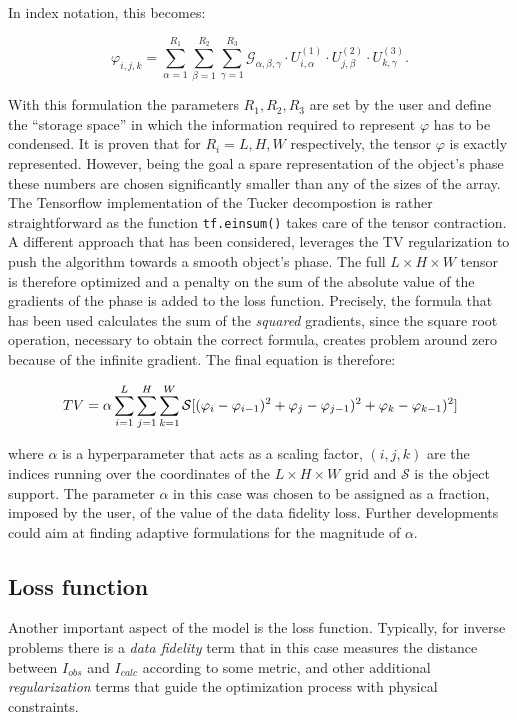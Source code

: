 In index notation, this becomes:

\[
\mathcal{\varphi}_{i,j,k} = \sum_{\alpha=1}^{R_1} \sum_{\beta=1}^{R_2} \sum_{\gamma=1}^{R_3}
\mathcal{G}_{\alpha,\beta,\gamma} \cdot U^{(1)}_{i,\alpha} \cdot U^{(2)}_{j,\beta} \cdot U^{(3)}_{k,\gamma}.
\]

With this formulation the parameters $R_1, R_2, R_3$ are set by the user and define the ``storage space'' in which the 
information required to represent $\varphi$ has to be condensed. It is proven that for $R_i = L,H,W$ respectively, the 
tensor $\varphi$ is exactly represented. However, being the goal a spare representation of the object's phase these numbers 
are chosen significantly smaller than any of the sizes of the array. The Tensorflow implementation of the Tucker decompostion 
is rather straightforward as the function \texttt{tf.einsum()} takes care of the tensor contraction.\\

A different approach that has been considered, leverages the TV regularization to push the algorithm towards a smooth object's 
phase. The full $L\times H\times W$ tensor is therefore optimized and a penalty on the sum of the absolute value of the 
gradients of the phase is added to the loss function. Precisely, the formula that has been used calculates the sum of the 
\textit{squared} gradients, since the square root operation, necessary to obtain the correct formula, creates 
problem around zero because of the infinite gradient. The final equation is therefore: 

\begin{equation}
\centering
   TV =  \alpha \sum_{i = 1}^{L}\sum_{j = 1}^{H}\sum_{k = 1}^{W} \mathcal S[(\varphi_{i} - \varphi_{i-1})^2 + \varphi_{j} - \varphi_{j-1})^2 +  \varphi_{k} - \varphi_{k-1})^2]
\end{equation}

where $\alpha $ is a hyperparameter that acts as a scaling factor, $(i,j,k)$ are the indices running over the coordinates of
the $L\times H\times W$ grid and $\mathcal S$ is the object support. The parameter $\alpha $ in this case was chosen to be assigned as a fraction, imposed by the user, 
of the value of the data fidelity loss. Further developments could aim at finding adaptive formulations for the magnitude 
of $\alpha $. 

\subsection{Loss function}
Another important aspect of the model is the loss function. Typically, for inverse problems there is a \textit{data fidelity}
term that in this case measures the distance between $I_{obs}$ and $ I_{calc}$ according to some metric, and other additional 
\textit{regularization} terms that guide the optimization process with physical constraints. 

